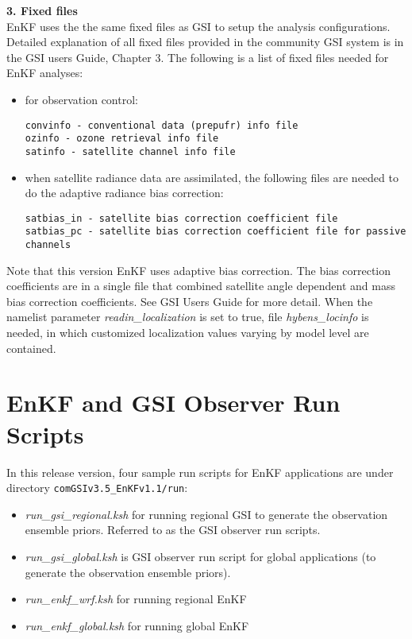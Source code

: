 \textbf{3. Fixed files} \\
EnKF uses the the same fixed files as GSI to setup the analysis configurations. Detailed explanation 
of all fixed files provided in the community GSI system is in the GSI user\textquotesingle s Guide, Chapter 3. 
The following is a list of fixed files needed for EnKF analyses:
\begin{itemize}
\item for observation control:
\begin{verbatim}
convinfo - conventional data (prepufr) info file 
ozinfo - ozone retrieval info file
satinfo - satellite channel info file
\end{verbatim}
\item when satellite radiance data are assimilated, the following files are needed to do the adaptive radiance bias correction:
\begin{small}
\begin{verbatim}
satbias_in - satellite bias correction coefficient file
satbias_pc - satellite bias correction coefficient file for passive channels
\end{verbatim}
\end{small}
\end{itemize}

Note that this version EnKF uses adaptive bias correction. The bias correction coefficients are in a single file that combined satellite angle dependent and mass bias correction coefficients. See GSI User\textquotesingle s Guide for 
more detail. When the namelist parameter \textit{readin\_localization} is set to true, file \textit{hybens\_locinfo} is 
needed, in which customized localization values varying by model level are contained.

\section{EnKF and GSI Observer Run Scripts}

In this release version, four sample run scripts for EnKF applications are under directory 
\verb|comGSIv3.5_EnKFv1.1/run|:
\begin{itemize}
\item \textit{run\_gsi\_regional.ksh} for running regional GSI to generate the observation ensemble priors. Referred to as the GSI observer run scripts.
\item \textit{run\_gsi\_global.ksh} is GSI observer run script for global applications (to generate the observation ensemble priors).
\item \textit{run\_enkf\_wrf.ksh} for running regional EnKF
\item \textit{run\_enkf\_global.ksh} for running global EnKF
\end{itemize}

